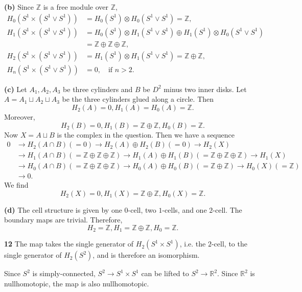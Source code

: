 \documentclass{article}
\makeatletter
\newcommand*{\shifttext}[1]{%
  \settowidth{\@tempdima}{#1}%
  \hspace{-\@tempdima}#1%
}
\newcommand{\plabel}[1]{%
\shifttext{\textbf{#1}\quad}%
}
\makeatother
\begin{document}
\plabel{(b)}%
Since $\mathbb{Z}$ is a free module over $\mathbb{Z}$,
\begin{align*}
    H_0(S^1 \times (S^1 \vee S^1)) &= H_0(S^1) \otimes H_0(S^1 \vee S^1) = \mathbb{Z}, \\
    H_1(S^1 \times (S^1 \vee S^1)) &= H_0(S^1) \otimes H_1(S^1\vee S^1) \oplus  H_1(S^1) \otimes H_0(S^1\vee S^1) \\
    &= \mathbb{Z} \oplus \mathbb{Z} \oplus \mathbb{Z}, \\
    H_2(S^1 \times (S^1 \vee S^1)) &= H_1(S^1) \otimes H_1(S^1\vee S^1) = \mathbb{Z} \oplus \mathbb{Z}, \\
    H_n(S^1 \times (S^1 \vee S^1)) &= 0,\quad \text{if } n>2.
\end{align*}

\plabel{(c)}%
Let $A_1, A_2, A_3$ be three cylinders and $B$ be $D^2$ minus two inner disks.
Let $A = A_1 \sqcup A_2 \sqcup A_3$ be the three cylinders glued along a circle.
Then
\[ H_2(A) = 0, H_1(A) = H_0(A) = \mathbb{Z}. \]
Moreover,
\[ H_2(B) =0, H_1(B) = \mathbb{Z} \oplus \mathbb{Z}, H_0(B) = \mathbb{Z}. \]
Now $X = A \sqcup B$ is the complex in the question.
Then we have a sequence
\begin{align*}
    0 &\rightarrow H_2(A\cap {B}) (=0) \rightarrow H_2(A)\oplus H_2(B) (=0) \rightarrow H_2(X) \\
    &\rightarrow H_1(A\cap {B})(=\mathbb{Z}\oplus \mathbb{Z} \oplus \mathbb{Z}) \rightarrow H_1(A)\oplus H_1(B) (=\mathbb{Z}\oplus \mathbb{Z} \oplus \mathbb{Z}) \rightarrow H_1(X) \\
    &\rightarrow H_0(A\cap {B})(=\mathbb{Z}\oplus \mathbb{Z} \oplus \mathbb{Z}) \rightarrow H_0(A)\oplus H_0(B) (=\mathbb{Z}\oplus \mathbb{Z}) \rightarrow H_0(X) (=\mathbb{Z}) \\
    &\rightarrow 0.
\end{align*}
We find
\[ H_2(X) = 0, H_1(X) = \mathbb{Z} \oplus \mathbb{Z}, H_0(X) = \mathbb{Z}. \]

\plabel{(d)}%
The cell structure is given by one $0$-cell, two $1$-cells, and one $2$-cell.
The boundary maps are trivial.
Therefore,
\[ H_2 = \mathbb{Z}, H_1 = \mathbb{Z} \oplus \mathbb{Z}, H_0 = \mathbb{Z}. \]

\plabel{12}%
The map takes the single generator of $H_2(S^1 \times S^1)$, i.e. the $2$-cell, to the single generator of $H_2(S^2)$, and is therefore an isomorphism.
\par
Since $S^2$ is simply-connected, $S^2 \rightarrow S^1 \times S^1$ can be lifted to $S^2 \rightarrow \mathbb{R}^2$.
Since $\mathbb{R}^2$ is nullhomotopic, the map is also nullhomotopic.
\end{document}
